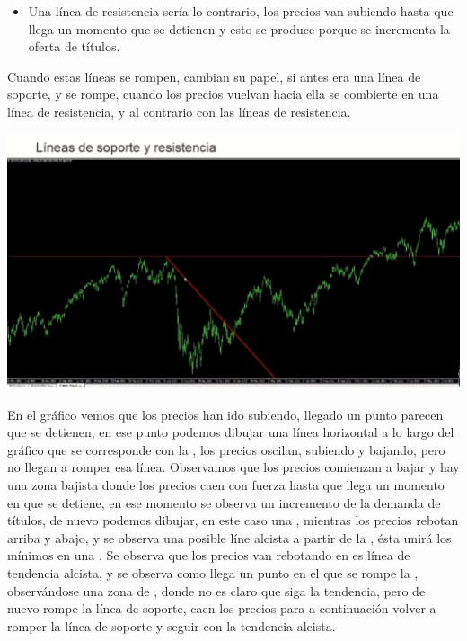 \begin{enumerate}
\begin{itemize}
        \item Una línea de resistencia sería lo contrario, los precios van subiendo hasta que llega un momento que se detienen y esto se produce porque se incrementa la oferta de títulos.
    \end{itemize}
    Cuando estas líneas se rompen, cambian su papel, si antes era una línea de soporte, y se rompe, cuando los precios vuelvan hacia ella se combierte en una línea de resistencia, y al contrario con las líneas de resistencia.
    \begin{center}
            \includegraphics[scale=.80]{images/soporte_resistencia.png}
        \end{center}
    En el gráfico vemos que los precios han ido subiendo, llegado un punto parecen que se detienen, en ese punto podemos dibujar una línea horizontal a lo largo del gráfico que se corresponde con la , los precios oscilan, subiendo y bajando, pero no llegan a romper esa línea. Observamos que los precios comienzan a bajar y hay una zona bajista donde los precios caen con fuerza hasta que llega un momento en que se detiene, en ese momento se observa un incremento de la demanda de títulos, de nuevo podemos dibujar, en este caso una , mientras los precios rebotan arriba y abajo, y se observa una posible líne alcista a partir de la , ésta unirá los mínimos en una . Se observa que los precios van rebotando en es línea de tendencia alcista, y se observa como llega un punto en el que se rompe la , observándose una zona de , donde no es claro que siga la tendencia, pero de nuevo rompe la línea de soporte, caen los precios para a continuación volver a romper la línea de soporte y seguir con la tendencia alcista.
\end{enumerate}

